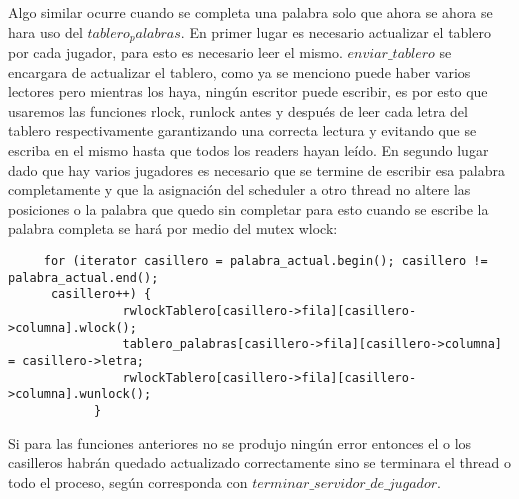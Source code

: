 Algo similar ocurre cuando se completa una palabra solo que ahora se ahora se hara uso del $tablero_palabras$. En primer lugar es necesario actualizar el tablero por cada jugador, para esto es necesario leer el mismo.
$enviar\_tablero$ se encargara de actualizar el tablero, como ya se menciono puede haber varios lectores pero mientras los haya, ningún escritor puede escribir, es por esto que usaremos las funciones rlock, runlock antes y después de leer cada letra del tablero respectivamente garantizando una correcta lectura y evitando que se escriba en el mismo hasta que todos los readers hayan leído.
En segundo lugar dado que hay varios jugadores es necesario que se termine de escribir esa palabra completamente y que la asignación del scheduler a  otro thread no altere las posiciones o la palabra que quedo sin completar para esto cuando se escribe la palabra completa se hará por medio del mutex wlock:
\begin{verbatim}
     for (iterator casillero = palabra_actual.begin(); casillero != palabra_actual.end();
      casillero++) {
                rwlockTablero[casillero->fila][casillero->columna].wlock();
                tablero_palabras[casillero->fila][casillero->columna] = casillero->letra;
                rwlockTablero[casillero->fila][casillero->columna].wunlock();
            }
\end{verbatim}
Si para las funciones anteriores no se produjo ningún error entonces el o los casilleros habrán quedado actualizado correctamente sino se terminara el thread o todo el proceso, según corresponda con $terminar\_servidor\_de\_jugador$.
